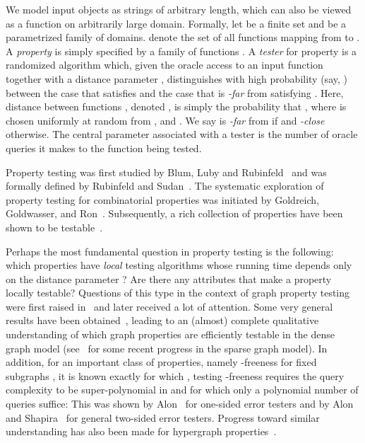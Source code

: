 \documentclass[11pt,english]{article}
\theoremstyle{definition}
\theoremstyle{remark}
\begin{document}
We model input objects as strings of arbitrary length, 
which can also be viewed as a function on arbitrarily large domain. 
Formally, let  be a finite set and  be a 
parametrized family of domains. 
 denote the set of all functions
mapping from  to . A \emph{property }
is simply specified by a family of functions .
A \emph{tester} for property  is a randomized algorithm
which, given the oracle access to an input function 
together with a distance parameter , distinguishes with high
probability (say, ) between the case that  satisfies 
and the case that  is \emph{-far} from satisfying .
Here, distance between functions ,
denoted , is simply the probability that ,
where  is chosen uniformly at random from , and
. We say
 is \emph{-far} from  if 
and \emph{-close} otherwise. The central parameter associated
with a tester is the number of oracle queries it makes to the function
 being tested.

Property testing was first studied by Blum, Luby and Rubinfeld~\cite{BLR93}
and was formally defined by Rubinfeld and Sudan~\cite{RS96}. The
systematic exploration of property testing for combinatorial properties
was initiated by Goldreich, Goldwasser, and Ron~\cite{GGR98}. Subsequently,
a rich collection of properties have been shown 
to be testable~\cite{AS05,AS05b,AFNS06,BCLSSV06,PRS03,AKNS00,AKKLR03,KR04,JPRZ04}.

Perhaps the most fundamental question in property testing is the following:
which properties have {\em local} testing algorithms whose running time depends
only on the distance parameter ? Are there any attributes that
make a property locally testable? Questions of this type in the
context of graph property testing were first raised in~\cite{GGR98}
and later received a lot of attention. Some very general results have
been obtained~\cite{AFKS00,AS05,AS05b,FN07,AFNS06,BCLSSV06}, leading
to an (almost) complete qualitative understanding of which graph properties
are efficiently testable in the dense graph model (see~\cite{BSS08}
for some recent progress in the sparse graph model). In addition,
for an important class of properties, namely -freeness for fixed
subgraphs , it is known exactly for which , testing -freeness
requires the query complexity to be super-polynomial in 
and for which only a polynomial number of queries suffice: This was
shown by Alon~\cite{Alo02} for one-sided error testers and by Alon
and Shapira~\cite{AS04} for general two-sided error testers. Progress
toward similar understanding has also been made for hypergraph properties~\cite{RS09,AT08,AS05b}.
\end{document}
